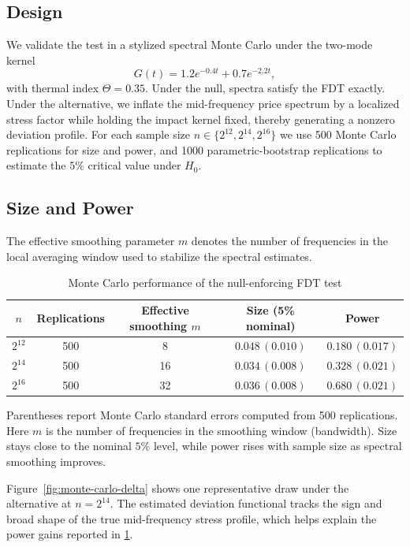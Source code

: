 \documentclass[11pt]{article}
\begin{document}
\subsection{Design}
We validate the test in a stylized spectral Monte Carlo under the two-mode kernel
\[
  G(t)=1.2e^{-0.4t}+0.7e^{-2.2t},
\]
with thermal index $\Theta=0.35$. Under the null, spectra satisfy the FDT exactly. Under the alternative, we inflate the mid-frequency price spectrum by a localized stress factor while holding the impact kernel fixed, thereby generating a nonzero deviation profile. For each sample size $n\in\{2^{12},2^{14},2^{16}\}$ we use 500 Monte Carlo replications for size and power, and 1000 parametric-bootstrap replications to estimate the $5\%$ critical value under $H_0$.

\subsection{Size and Power}
The effective smoothing parameter $m$ denotes the number of frequencies in the local averaging window used to stabilize the spectral estimates.

\begin{table}[t]
\centering
\caption{Monte Carlo performance of the null-enforcing FDT test}
\begin{tabular}{ccccc}
\toprule
$n$ & Replications & Effective smoothing $m$ & Size (5\% nominal) & Power \\
\midrule
$2^{12}$ & 500 & 8  & $0.048\,(0.010)$ & $0.180\,(0.017)$ \\
$2^{14}$ & 500 & 16 & $0.034\,(0.008)$ & $0.328\,(0.021)$ \\
$2^{16}$ & 500 & 32 & $0.036\,(0.008)$ & $0.680\,(0.021)$ \\
\bottomrule
\end{tabular}
\vspace{0.4em}

\parbox{0.9\textwidth}{\footnotesize Parentheses report Monte Carlo standard
errors computed from 500 replications. Here $m$ is the number of frequencies in
the smoothing window (bandwidth). Size stays close to the nominal $5\%$ level,
while power rises with sample size as spectral smoothing improves.}
\label{tab:monte-carlo}
\end{table}

Figure~\ref{fig:monte-carlo-delta} shows one representative draw under the alternative at $n=2^{14}$. The estimated deviation functional tracks the sign and broad shape of the true mid-frequency stress profile, which helps explain the power gains reported in \cref{tab:monte-carlo}.
\end{document}
